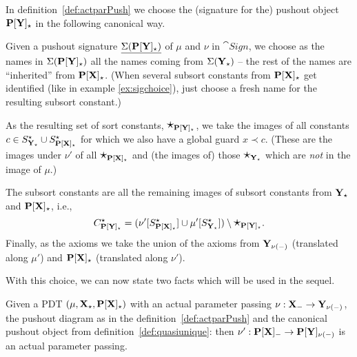 \begin{definition}\label{def:quasiunique}
In definition~\ref{def:actparPush} we choose the (signature for the)
pushout object ${\bf P[Y]_\star}$ in the following canonical way. 

Given a pushout signature $\underline{\Sigma({\bf P[Y]_\star})}$ of $\mu$ and $\nu$ in
$\cat{Sign}$, we choose as the names in $\Sigma({\bf P[Y]_\star})$ all the names coming from $\Sigma({\bf Y}_\star)$ -- the rest of the names are ``inherited'' from ${\bf P[X]_\star}$. 
(When several subsort constants from ${\bf P[X]_\star}$ get identified
 (like in example \ref{ex:sigchoice}), 
just choose a fresh name for the resulting subsort constant.)

As the resulting set of sort constants, 
$\mbox{\Large{$\star$}}_{{\bf P[Y]_{\star}}}$, we take the images of all constants
$c\in S^\star_{{\bf Y_{\star}}}\cup S^\star_{{\bf P[X]_{\star}}}$ for which we also have a
global guard $x\prec c$. (These are 
the images under $\nu'$ of all
$\mbox{\Large{$\star$}}_{{\bf P[X]_{\star}}}$ and (the images of) those
$\mbox{\Large{$\star$}}_{{\bf Y_{\star}}}$ which are {\em not} in the image of $\mu$.)

The subsort constants are all the remaining images of subsort constants from
${\bf Y_\star}$ and ${\bf P[X]_\star}$, i.e., 
\[C^\star_{{\bf P[Y]_{\star}}} = (\nu'[S^\star_{{\bf P[X]_{\star}}}] \cup
\mu'[S^\star_{{\bf Y}_{\star}}]) \setminus \mbox{\Large{$\star$}}_{{\bf P[Y]_{\star}}}.
\]
Finally, as the axioms we take the union of the axioms from
${\bf Y_{\nu(-)}}$ (translated along $\mu'$) and ${\bf P[X]_\star}$ (translated along $\nu'$).
\end{definition}
%
With this choice, we can now state two facts which will
be used in the sequel.
%
\begin{lemma}\label{le:weakmu}
Given a PDT $(\mu,{\bf X_\star},{\bf P[X]_\star})$ with an actual parameter
passing $\nu: {\bf X_-} \to {\bf Y_{\nu(-)}}$,
the pushout diagram as in the definition~\ref{def:actparPush} and the
canonical pushout object from definition~\ref{def:quasiunique}:
then $\nu': {\bf P[X]_-} \to {\bf P[Y]_{\nu(-)}}$ is an actual
parameter passing. 
\end{lemma}
